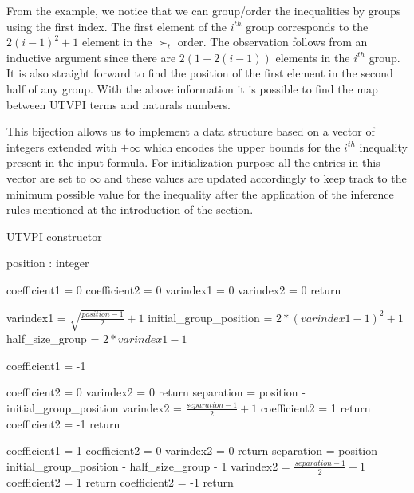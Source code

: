 From the example, we notice that we can group/order the inequalities by groups using the first
index. The first element of the $i^{th}$ group corresponds to the $2(i-1)^2 + 1$ element in the 
$\succ_t$ order. The observation follows from an inductive argument since there are 
$2(1 + 2(i-1))$ elements in the $i^{th}$ group. It is also straight forward to find the
position of the first element in the second half of any group. With the above information
it is possible to find the map between UTVPI terms and naturals numbers.

This bijection allows us to implement a data 
structure based on a vector of integers extended
with $\pm \infty$ which encodes the upper bounds 
for the $i^{th}$ inequality present in the 
input formula. For initialization purpose all 
the entries in this vector are set to
$\infty$ and these values are updated accordingly 
to keep track to the minimum possible value 
for the inequality after the application of the 
inference rules mentioned at the
introduction of the section.

\begin{algorithm}[!ht]
  \caption{UTVPI constructor}
  \linespread{\separationline}\selectfont
  \begin{algorithmic}[2]
     {position : integer}

    \State coefficient1 = 0
    \State coefficient2 = 0
    \State varindex1 = 0
    \State varindex2 = 0
    \State return
    \EndIf

    \State varindex1 = $\sqrt{\frac{position - 1}{2}} + 1$
    \State initial\_group\_position = $2*(varindex1-1)^2 + 1$
    \State half\_size\_group = $2*varindex1-1$

    \State coefficient1 = -1

    \State coefficient2 = 0
    \State varindex2 = 0
    \State return
    \EndIf
    \State separation = position - initial\_group\_position
    \State varindex2 = $\frac{separation - 1}{2} + 1$
    \State coefficient2 = 1
    \State return
    \EndIf
    \State coefficient2 = -1
    \State return
    \EndIf

    \State coefficient1 = 1
    \State coefficient2 = 0
    \State varindex2 = 0
    \State return
    \EndIf
    \State separation = position - initial\_group\_position - half\_size\_group - 1
    \State varindex2 = $\frac{separation - 1}{2} + 1$
    \State coefficient2 = 1
    \State return
    \EndIf
    \State coefficient2 = -1
    \State return
    \EndProcedure
  \end{algorithmic}
\end{algorithm}

